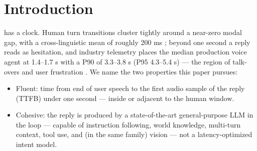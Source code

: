 \documentclass[journal]{IEEEtran}
\begin{document}






%
\IEEEpeerreviewmaketitle



\section{Introduction}
% 
% 
% 
% 
  has a clock. Human turn transitions cluster tightly around a near-zero modal gap, with a cross-linguistic mean of roughly 200 ms \cite{stivers2009turntaking}; beyond one second a reply reads as hesitation, and industry telemetry places the median production voice agent at 1.4–1.7 s with a P90 of 3.3–3.8 s (P95 4.3–5.4 s) — the region of talk-overs and user frustration \cite{sharma2026latency,hamming2026metrics}. We name the two properties this paper pursues:

    \begin{itemize}
        \item Fluent: time from end of user speech to the first audio sample of the reply (TTFB) under one second — inside or adjacent to the human window.
        \item Cohesive: the reply is produced by a state-of-the-art general-purpose LLM in the loop — capable of instruction following, world knowledge, multi-turn context, tool use, and (in the same family) vision — not a latency-optimized intent model.
    \end{itemize}
\end{document}

